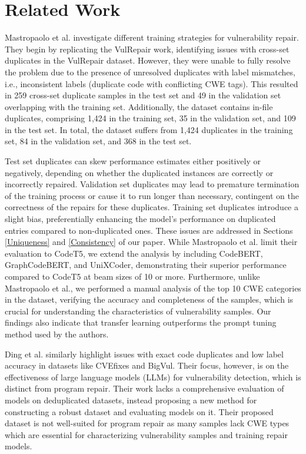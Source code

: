\section{Related Work} \label{Related-Work}
Mastropaolo et al.\cite{mastropaolo2024training} investigate different training strategies for vulnerability repair.
They begin by replicating the VulRepair work, identifying issues with cross-set duplicates in the VulRepair dataset.
However, they were unable to fully resolve the problem due to the presence of unresolved duplicates with label mismatches, i.e., inconsistent labels (duplicate code with conflicting CWE tags).
This resulted in 259 cross-set duplicate samples in the test set and 49 in the validation set overlapping with the training set. 
Additionally, the dataset contains in-file duplicates, comprising 1,424 in the training set, 35 in the validation set, and 109 in the test set. 
In total, the dataset suffers from 1,424 duplicates in the training set, 84 in the validation set, and 368 in the test set.


Test set duplicates can skew performance estimates either positively or negatively, depending on whether the duplicated instances are correctly or incorrectly repaired. 
Validation set duplicates may lead to premature termination of the training process or cause it to run longer than necessary, contingent on the correctness of the repairs for these duplicates.
Training set duplicates introduce a slight bias, preferentially enhancing the model's performance on duplicated entries compared to non-duplicated ones.
These issues are addressed in Sections \ref{Uniqueness} and \ref{Consistency} of our paper.
While Mastropaolo et al. limit their evaluation to CodeT5, we extend the analysis by including CodeBERT, GraphCodeBERT, and UniXCoder, demonstrating their superior performance compared to CodeT5 at beam sizes of 10 or more.
Furthermore, unlike Mastropaolo et al.\cite{mastropaolo2024training}, we performed a manual analysis of the top 10 CWE categories in the dataset, verifying the accuracy and completeness of the samples, which is crucial for understanding the characteristics of vulnerability samples.
Our findings also indicate that transfer learning outperforms the prompt tuning method used by the authors.

Ding et al.\cite{ding2024vulnerability} similarly highlight issues with exact code duplicates and low label accuracy in datasets like CVEfixes and BigVul.
Their focus, however, is on the effectiveness of large language models (LLMs) for vulnerability detection, which is distinct from program repair.
Their work lacks a comprehensive evaluation of models on deduplicated datasets, instead proposing a new method for constructing a robust dataset and evaluating models on it.
Their proposed dataset is not well-suited for program repair as many samples lack CWE types which are essential for characterizing vulnerability samples and training repair models.

